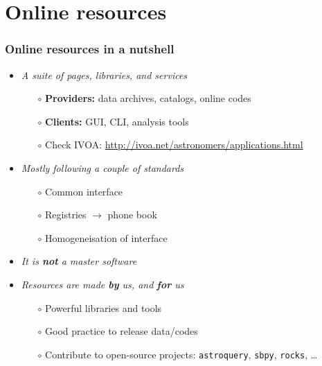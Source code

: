 \section{Online resources}

\begin{frame}
  \frametitle{Online resources in a nutshell}

  \begin{itemize}[<+->]
    \item \emph{A suite of pages, libraries, and services}
      \begin{itemize}[<.->]
        \item[$\circ$] \textbf{Providers:} data archives, catalogs, online codes
        \item[$\circ$] \textbf{Clients:} GUI, CLI, analysis tools
        \item[$\circ$] Check IVOA: \url{http://ivoa.net/astronomers/applications.html}
      \end{itemize}

    \vspace{1em}
    \item \emph{Mostly following a couple of standards}
      \begin{itemize}[<.->]
        \item[$\circ$] Common interface 
        \item[$\circ$] Registries $\rightarrow$ phone book
        \item[$\circ$] Homogeneisation of interface 
      \end{itemize}

    \vspace{1em}
    \item \emph{It is \textbf{not} a master software}

    \vspace{1em}
    \item \emph{Resources are made \textbf{by} us, and \textbf{for} us}
      \begin{itemize}[<.->]
        \item[$\circ$] Powerful libraries and tools
        \item[$\circ$] Good practice to release data/codes 
        \item[$\circ$] Contribute to open-source projects: \texttt{astroquery}, \texttt{sbpy}, \texttt{rocks}, \dots
      \end{itemize}

  \end{itemize}

\end{frame}
